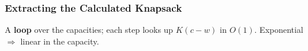 \begin{frame*}
  \frametitle{Extracting the Calculated Knapsack}
  \simplified
  \par\medskip
  A \textbf{loop} over the capacities; each step looks up $K(c - w)$ in
  $O(1)$. Exponential $\Longrightarrow$ linear in the capacity.
\end{frame*}

